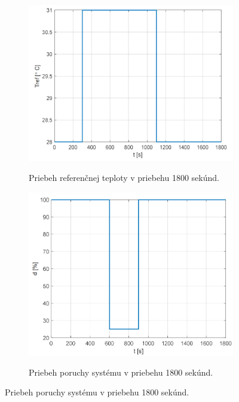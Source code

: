 \documentclass{article}
\begin{document}
\begin{figure}[!htbp]
	\begin{subfigure}{0.5\textwidth}
		\includegraphics[width=\textwidth]{./include/ziadanaHodnota.png}
		\label{fig:ziadanaHodnota}
		\caption{Priebeh referenčnej teploty v priebehu 1800 sekúnd.}
	\end{subfigure}
	\hfill
	\begin{subfigure}{0.5\textwidth}
		\includegraphics[width=\textwidth]{./include/porucha.png}
		\label{fig:porucha}
		\caption{Priebeh poruchy systému v priebehu 1800 sekúnd.}
	\end{subfigure}
\end{figure}
\end{document}
